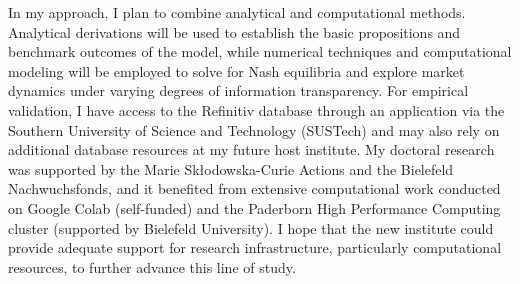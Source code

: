 \documentclass{nfr}
\begin{document}

In my approach, I plan to combine analytical and computational methods. Analytical derivations will be used to establish the basic propositions and benchmark outcomes of the model, while numerical techniques and computational modeling will be employed to solve for Nash equilibria and explore market dynamics under varying degrees of information transparency. For empirical validation, I have access to the Refinitiv database through an application via the Southern University of Science and Technology (SUSTech) and may also rely on additional database resources at my future host institute. My doctoral research was supported by the Marie Skłodowska-Curie Actions and the Bielefeld Nachwuchsfonds, and it benefited from extensive computational work conducted on Google Colab (self-funded) and the Paderborn High Performance Computing cluster (supported by Bielefeld University). I hope that the new institute could provide adequate support for research infrastructure, particularly computational resources, to further advance this line of study.









% 


\newpage

\appendix
\end{document}
